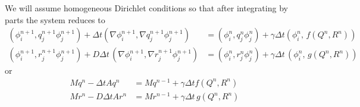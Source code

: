 \documentclass{article}
\begin{document}
We will assume homogeneous Dirichlet conditions so that after integrating by
parts the system reduces to
\begin{align}
    (\phi_i^{n+1}, q_j^{n+1}\phi_j^{n+1}) + \Delta t (\nabla \phi_i^{n+1}, \nabla q_j^{n+1} \phi_j^{n+1})
    &= (\phi_i^{n}, q_j^{n}\phi_j^{n}) + \gamma \Delta t (\phi_i^{n},\, f(Q^{n}, R^{n}))\\
    (\phi_i^{n+1}, r_j^{n+1} \phi_j^{n+1}) + D\Delta t\, (\nabla \phi_i^{n+1},\nabla r_j^{n+1}\phi_j^{n+1})
    &= (\phi_i^n, r_j^{n}\phi_j^{n}) + \gamma \Delta t\, (\phi_i^{n},\, g(Q^{n}, R^{n}))
\end{align}
or
\begin{align}
    Mq^n - \Delta t Aq^n
    &= Mq^{n-1} + \gamma \Delta t f(Q^{n}, R^{n})\\
    Mr^n - D\Delta t Ar^n
    &= Mr^{n-1} + \gamma \Delta t\, g(Q^{n}, R^{n})
\end{align}
\end{document}
